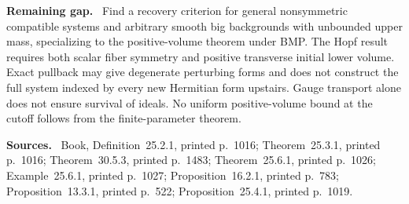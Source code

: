 \documentclass[11pt]{article}
\newcommand{\field}[1]{\par\medskip\noindent\textbf{#1.}\ }
\begin{document}
\field{Remaining gap} Find a recovery criterion for general nonsymmetric compatible systems and arbitrary smooth big backgrounds with unbounded upper mass, specializing to the positive-volume theorem under BMP. The Hopf result requires both scalar fiber symmetry and positive transverse initial lower volume. Exact pullback may give degenerate perturbing forms and does not construct the full system indexed by every new Hermitian form upstairs. Gauge transport alone does not ensure survival of ideals. No uniform positive-volume bound at the cutoff follows from the finite-parameter theorem.
\field{Sources} Book, Definition~25.2.1, printed p.~1016; Theorem~25.3.1, printed p.~1016; Theorem~30.5.3, printed p.~1483; Theorem~25.6.1, printed p.~1026; Example~25.6.1, printed p.~1027; Proposition~16.2.1, printed p.~783; Proposition~13.3.1, printed p.~522; Proposition~25.4.1, printed p.~1019.
\end{document}

